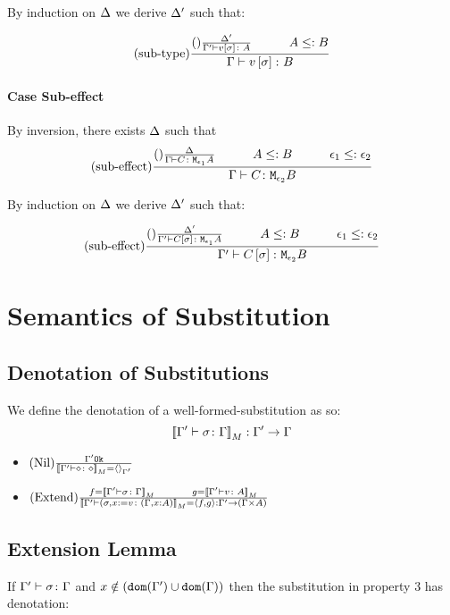 {        By induction on $\Delta$ we derive $\Delta'$ such that:

        \begin{equation}
            \treerule{sub-type}{\treerule{}{\D'}{\typerelation{\G'}{v\ssi}{A}}\s\s A\subtype B}{\typerelation{\G}{v\ssi}{B}}
        \end{equation}
    \paragraph{Case Sub-effect}
    By inversion, there exists $\Delta$ such that
    \begin{equation}
        \treerule{sub-effect}{\treerule{}{\D}{\typerelation{\G}{C}{\M{\e_1}{A}}}\s\s A\subtype B\s\s\e_1\subtype\e_2}{\typerelation{\G}{C}{\M{\e_2}{B}}}
    \end{equation}

    By induction on $\Delta$ we derive $\Delta'$ such that:

    \begin{equation}
        \treerule{sub-effect}{\treerule{}{\D'}{\typerelation{\G'}{C\ssi}{\M{\e_1}{A}}}\s\s A\subtype B\s\s\e_1\subtype\e_2}{\typerelation{\G'}{C\ssi}{\M{\e_2}{B}}}
    \end{equation}
    \section{Semantics of Substitution}
    \subsection{Denotation of Substitutions}
    We define the denotation of a well-formed-substitution as so:
    \begin{equation}
        {\bf [\![}\Gamma' \vdash \sigma \colon \Gamma{\bf ]\!]}_M: \Gamma' \rightarrow \Gamma
    \end{equation}
    \begin{itemize}
        \item $(\text{Nil}) \frac{\Gamma' \texttt{Ok}}{{\bf [\![}\Gamma' \vdash \diamond \colon \diamond{\bf ]\!]}_M = \left\langle\right\rangle_{\Gamma'}}$
        \item $\treerule{Extend}{f = \deno{\typerelation{\G'}{\si}{\G}}\s\s g= \deno{\typerelation{\G'}{v}{A}}}{\deno{\typerelation{\G'}{(\si, x\setto v}{(\gax)}} = \pr{f}{g}:\G' \rightarrow (\G\times A)}$
    \end{itemize}
    \subsection{Extension Lemma}
    If $\Gamma' \vdash \sigma \colon \Gamma$ and $x\notin(\texttt{dom}(\Gamma')\cup\texttt{dom}(\Gamma))$ then the substitution in property 3 has denotation:

}
